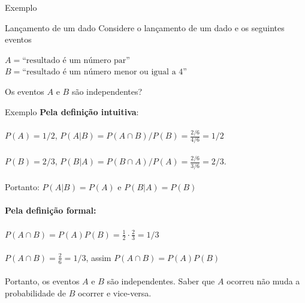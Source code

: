 \documentclass[10pt]{beamer}\usepackage[]{graphicx}\usepackage[]{color}
\theoremstyle{definition}
\begin{document}
\begin{frame}[fragile]{Exemplo}
  \begin{block}{Lançamento de um dado}
    Considere o lançamento de um dado e os seguintes eventos
    \begin{center}
      $A = \text{``resultado é um número par''}$\\
      $B = \text{``resultado é um número menor ou igual a 4''}$
    \end{center}
    Os eventos $A$ e $B$ são independentes?
  \end{block}
  \begin{center}
  \end{center}
\end{frame}

\begin{frame}{Exemplo}
  \textbf{Pela definição intuitiva}: \\~\\
  $P(A) = 1/2$, \quad $P(A|B) = P(A\cap B)/P(B) = \frac{2/6}{4/6} =
  1/2$ \\~\\
  $P(B) = 2/3$, \quad $P(B|A) = P(B\cap A)/P(A) = \frac{2/6}{3/6} =
  2/3$. \\~\\
  Portanto: $P(A|B) = P(A)$ e $P(B|A) = P(B)$ \\~\\
  \textbf{Pela definição formal:} \\~\\
  $P(A \cap B) = P(A)P(B) = \frac{1}{2} \cdot \frac{2}{3} = 1/3$ \\~\\
  $P(A \cap B) = \frac{2}{6} = 1/3$, assim $P(A \cap B) = P(A)P(B)$ \\~\\
  Portanto, os eventos $A$ e $B$ são independentes. Saber que $A$
  ocorreu não muda a probabilidade de $B$ ocorrer e vice-versa.
\end{frame}
\end{document}
